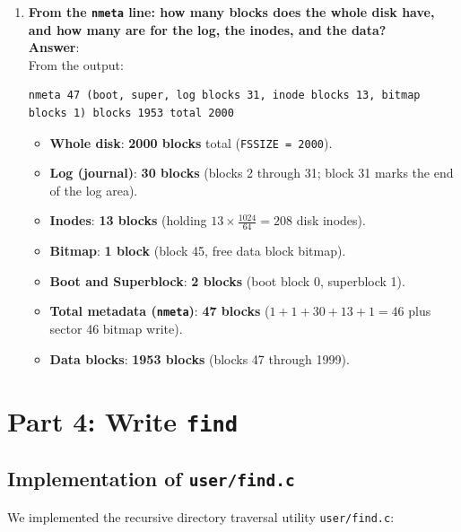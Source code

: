 \documentclass[12pt,a4paper]{article}
\begin{document}
\begin{enumerate}
    \item \textbf{From the \texttt{nmeta} line: how many blocks does the whole disk have, and how many are for the log, the inodes, and the data?} \\
    \textbf{Answer}: \\
    From the output:
    \begin{lstlisting}[style=consolestyle]
nmeta 47 (boot, super, log blocks 31, inode blocks 13, bitmap blocks 1) blocks 1953 total 2000
    \end{lstlisting}
    \begin{itemize}
        \item \textbf{Whole disk}: \textbf{2000 blocks} total (\texttt{FSSIZE = 2000}).
        \item \textbf{Log (journal)}: \textbf{30 blocks} (blocks 2 through 31; block 31 marks the end of the log area).
        \item \textbf{Inodes}: \textbf{13 blocks} (holding $13 \times \frac{1024}{64} = 208$ disk inodes).
        \item \textbf{Bitmap}: \textbf{1 block} (block 45, free data block bitmap).
        \item \textbf{Boot and Superblock}: \textbf{2 blocks} (boot block 0, superblock 1).
        \item \textbf{Total metadata (\texttt{nmeta})}: \textbf{47 blocks} ($1 + 1 + 30 + 13 + 1 = 46$ plus sector 46 bitmap write).
        \item \textbf{Data blocks}: \textbf{1953 blocks} (blocks 47 through 1999).
    \end{itemize}
\end{enumerate}

\newpage

\section{Part 4: Write \texttt{find}}

\subsection{Implementation of \texttt{user/find.c}}
We implemented the recursive directory traversal utility \texttt{user/find.c}:
\end{document}
